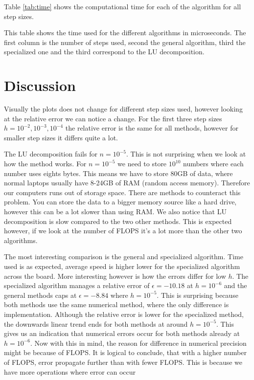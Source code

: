\documentclass[reprint, english,notitlepage]{revtex4-1}  %
\begin{document}
Table \ref{tab:time} shows the computational time for each of the algorithm for all step sizes.

\begin{table}  %
  
  \caption{This table shows the time used for the different algorithms in microseconds. The first column is the number of steps used, second the general algorithm, third the specialized one and the third correspond to the LU decomposition.}
	\label{tab:time}
\end{table}



\section{Discussion}

Visually the plots does not change for different step sizes used, however looking at the relative error we can notice a change. For the first three step sizes $h = 10^{-2}, 10^{-3}, 10^{-4}$ the relative error is the same for all methods, however for smaller step sizes it differs quite a lot.

The LU decomposition fails for $n=10^{-5}$. This is not surprising when we look at how the method works. For $n=10^{-5}$ we need to store $10^10$ numbers where each number uses eights bytes. This means we have to store 80GB of data, where normal laptops usually have 8-24GB of RAM (random access memory). Therefore our computers runs out of storage space. There are methods to counteract this problem. You can store the data to a bigger memory source like a hard drive, however this can be a lot slower than using RAM. We also notice that LU decomposition is slow compared to the two other methods. This is expected however, if we look at the number of FLOPS it's a lot more than the other two algorithms.

The most interesting comparison is the general and specialized algorithm. Time used is as expected, average speed is higher lower for the specialized algorithm across the board. More interesting however is how the errors differ for low $h$. The specialized algorithm manages a relative error of $\epsilon = -10.18$ at $h=10^{-6}$ and the general methods caps at $\epsilon = -8.84$ where $h = 10^{-5}$. This is surprising because both methods use the same numerical method, where the only difference is implementation. Although the relative error is lower for the specialized method, the downwards linear trend ends for both methods at around $h=10^{-5}$. This gives us an indication that numerical errors occur for both methods already at $h=10^{-6}$. Now with this in mind, the reason for difference in numerical precision might be because of FLOPS. It is logical to conclude, that with a higher number of FLOPS, error propagate further than with fewer FLOPS. This is because we have more operations where error can occur
\end{document}
